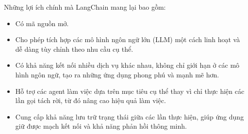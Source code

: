 Những lợi ích chính mà LangChain mang lại bao gồm:
\begin{itemize}
    \item Có mã nguồn mở.
    \item Cho phép tích hợp các mô hình ngôn ngữ lớn (LLM) một cách linh hoạt và dễ dàng tùy chỉnh theo nhu cầu cụ thể.
    \item Có khả năng kết nối nhiều dịch vụ khác nhau, không chỉ giới hạn ở các mô hình ngôn ngữ, tạo ra những ứng dụng phong phú và mạnh mẽ hơn.
    \item Hỗ trợ các agent làm việc dựa trên mục tiêu cụ thể thay vì chỉ thực hiện các lần gọi tách rời, từ đó nâng cao hiệu quả làm việc.
    \item Cung cấp khả năng lưu trữ trạng thái giữa các lần thực hiện, giúp ứng dụng giữ được mạch kết nối và khả năng phản hồi thông minh.
\end{itemize}












